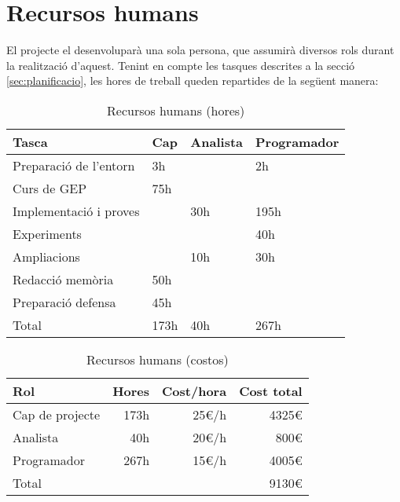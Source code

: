 \section{Recursos humans}
	El projecte el desenvoluparà una sola persona, que assumirà diversos rols durant la realització d'aquest. Tenint en compte les tasques descrites a la secció \ref{sec:planificacio},
	les hores de treball queden repartides de la següent manera:
	\begin{table}[H]
		\begin{center}
			\begin{tabular}{m{4.2cm} !{\vrule width -1pt}x{2.4cm} !{\vrule width -1pt}x{2.4cm} !{\vrule width -1pt}x{3cm}}
				\textbf{Tasca} & \textbf{Cap} & \textbf{Analista} & \textbf{Programador} \\ \hline
				Preparació de l'entorn & 3h & & 2h \\
				Curs de GEP & 75h & & \\
				Implementació i proves & & 30h & 195h \\
				Experiments & & & 40h \\
				Ampliacions & & 10h & 30h\\
				Redacció memòria & 50h & & \\
				Preparació defensa & 45h & & \\
				\noalign{\vskip 4mm}
				Total & 173h & 40h & 267h
			\end{tabular}
		\end{center}
		\caption{Recursos humans (hores)}
	\end{table}
	\begin{table}[H]
		\begin{center}
			\begin{tabular}{l !{\vrule width -1pt}r !{\vrule width -1pt}r !{\vrule width -1pt}r}
				\textbf{Rol} & \textbf{Hores} & \textbf{Cost/hora} & \textbf{Cost total} \\ \hline
				Cap de projecte & 173h & 25€/h & 4325€ \\
				Analista & 40h & 20€/h & 800€ \\
				Programador & 267h & 15€/h & 4005€ \\
				\noalign{\vskip 4mm}
				Total & & & 9130€
			\end{tabular}
		\end{center}
		\caption{Recursos humans (costos)}
	\end{table}


